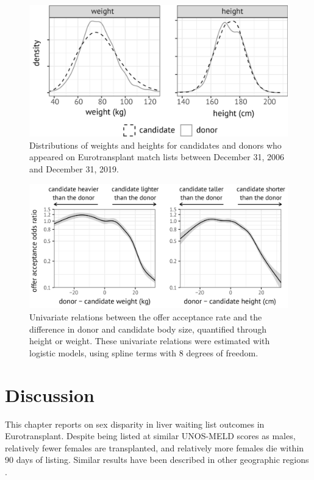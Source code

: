 \documentclass[11pt,twoside,]{book}
\begin{document}
\begin{figure}[ht]

{\centering \includegraphics[width=0.75\linewidth]{figures/ch4/size_distr} 

}

\caption{Distributions of weights and heights for candidates and donors
  who appeared on Eurotransplant match lists between December 31, 2006 and December 31, 2019.}\label{fig:ch4sfigsize}
\end{figure}

\begin{figure}[ht]

{\centering \includegraphics[width=0.9\linewidth]{figures/ch4/sfig_univariate} 

}

\caption{Univariate relations between the offer acceptance rate and the difference in donor and candidate body size, quantified through height or weight. These univariate relations were estimated with logistic models, using spline terms with 8 degrees of freedom.}\label{fig:ch4sfigoff}
\end{figure}

\FloatBarrier
\newpage

\section{Discussion}\label{discussion-1}

This chapter reports on sex disparity in liver waiting list outcomes in Eurotransplant.
Despite being listed at similar UNOS-MELD scores as males, relatively fewer females
are transplanted, and relatively more females die within 90 days of listing.
Similar results have been described in other geographic regions \citep{moylanDisparitiesLiverTransplantation2008, mathurSexBasedDisparitiesLiver2011, laiHeightContributesGender2010, lockeQuantifyingSexBasedDisparities2020a}.
\end{document}
